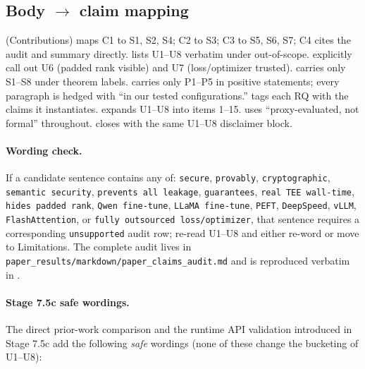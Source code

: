 \subsection*{Body $\to$ claim mapping}
 (Contributions) maps C1 to S1, S2, S4; C2 to S3; C3 to S5, S6, S7; C4 cites the audit and summary directly.  lists U1--U8 verbatim under out-of-scope.  explicitly call out U6 (padded rank visible) and U7 (loss/optimizer trusted).  carries only S1--S8 under theorem labels.  carries only P1--P5 in positive statements; every paragraph is hedged with ``in our tested configurations.''  tags each RQ with the claims it instantiates.  expands U1--U8 into items 1--15.  uses ``proxy-evaluated, not formal'' throughout.  closes with the same U1--U8 disclaimer block.

\paragraph{Wording check.}
If a candidate sentence contains any of: \texttt{secure}, \texttt{provably}, \texttt{cryptographic}, \texttt{semantic security}, \texttt{prevents all leakage}, \texttt{guarantees}, \texttt{real TEE wall-time}, \texttt{hides padded rank}, \texttt{Qwen fine-tune}, \texttt{LLaMA fine-tune}, \texttt{PEFT}, \texttt{DeepSpeed}, \texttt{vLLM}, \texttt{FlashAttention}, or \texttt{fully outsourced loss/optimizer}, that sentence requires a corresponding \texttt{unsupported} audit row; re-read U1--U8 and either re-word or move to Limitations. The complete audit lives in \texttt{paper\_results/markdown/paper\_claims\_audit.md} and is reproduced verbatim in .

\paragraph{Stage 7.5c safe wordings.}
The direct prior-work comparison and the runtime API validation introduced in Stage 7.5c add the following \emph{safe} wordings (none of these change the bucketing of U1--U8):

